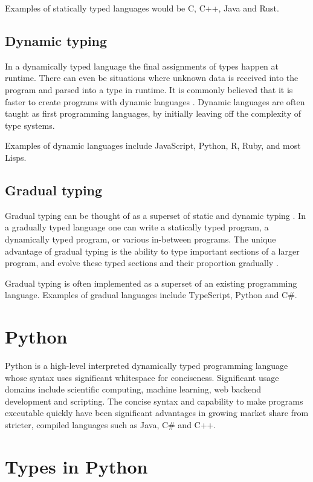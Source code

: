 Examples of statically typed languages would be C, C++, Java and Rust.

\subsection{Dynamic typing}
In a dynamically typed language the final assignments of types happen at runtime. There can even be situations where unknown data is received into the program and parsed into a type in runtime. It is commonly believed that it is faster to create programs with dynamic languages \citetemp. Dynamic languages are often taught as first programming languages, by initially leaving off the complexity of type systems.

Examples of dynamic languages include JavaScript, Python, R, Ruby, and most Lisps.

\subsection{Gradual typing}
Gradual typing can be thought of as a superset of static and dynamic typing \cite{siek_refined_gradual_2015}. In a gradually typed language one can write a statically typed program, a dynamically typed program, or various in-between programs. The unique advantage of gradual typing is the ability to type important sections of a larger program, and evolve these typed sections and their proportion gradually \cite{siek_refined_gradual_2015}. 

Gradual typing is often implemented as a superset of an existing programming language. Examples of gradual languages include TypeScript, Python and C\#.


\section{Python}
Python is a high-level interpreted dynamically typed programming language whose syntax uses significant whitespace for conciseness. Significant usage domains include scientific computing, machine learning, web backend development and scripting. The concise syntax and capability to make programs executable quickly have been significant advantages in growing market share from stricter, compiled languages such as Java, C\# and C++.


\section{Types in Python}

